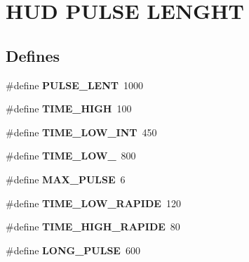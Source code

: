 \hypertarget{group__group3}{
\section{HUD PULSE LENGHT}
\label{group__group3}
}
\subsection*{Defines}
\begin{DoxyCompactItemize}
\item 
\hypertarget{group__group3_gaefc417fae2df7283853357f526656fbf}{
\#define {\bfseries PULSE\_\-LENT}~1000}
\label{group__group3_gaefc417fae2df7283853357f526656fbf}

\item 
\hypertarget{group__group3_gaacc586397155a351682b083702ab5d4d}{
\#define {\bfseries TIME\_\-HIGH}~100}
\label{group__group3_gaacc586397155a351682b083702ab5d4d}

\item 
\hypertarget{group__group3_ga50343eff6b3fb09b004faa7ffd5efd4c}{
\#define {\bfseries TIME\_\-LOW\_\-INT}~450}
\label{group__group3_ga50343eff6b3fb09b004faa7ffd5efd4c}

\item 
\hypertarget{group__group3_ga9424305e07c22ee562b12aef32fa6a32}{
\#define {\bfseries TIME\_\-LOW\_}~800}
\label{group__group3_ga9424305e07c22ee562b12aef32fa6a32}

\item 
\hypertarget{group__group3_ga185b4dd6ffe8f2446d26cde1a059f740}{
\#define {\bfseries MAX\_\-PULSE}~6}
\label{group__group3_ga185b4dd6ffe8f2446d26cde1a059f740}

\item 
\hypertarget{group__group3_ga8402f2757ea472595faa1e66b2978cd6}{
\#define {\bfseries TIME\_\-LOW\_\-RAPIDE}~120}
\label{group__group3_ga8402f2757ea472595faa1e66b2978cd6}

\item 
\hypertarget{group__group3_gad2f70916addfd7f12421712097782903}{
\#define {\bfseries TIME\_\-HIGH\_\-RAPIDE}~80}
\label{group__group3_gad2f70916addfd7f12421712097782903}

\item 
\hypertarget{group__group3_ga7f8cd8ad7987ee77f884dd9537c6ac49}{
\#define {\bfseries LONG\_\-PULSE}~600}
\label{group__group3_ga7f8cd8ad7987ee77f884dd9537c6ac49}

\end{DoxyCompactItemize}

